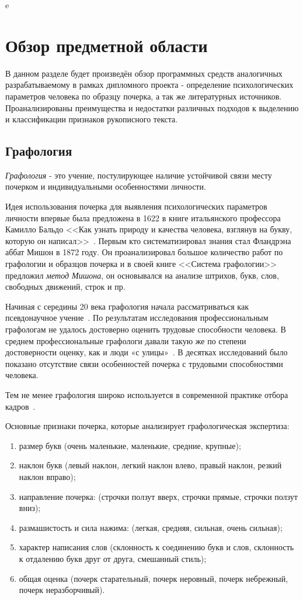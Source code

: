 e\section{Обзор предметной области}
\label{sec:domain:intro}

В данном разделе будет произведён обзор программных средств аналогичных разрабатываемому в рамках дипломного проекта - определение психологических параметров человека по образцу почерка, а так же литературных источников. Проанализированы преимущества и недостатки различных подходов к выделению и классификации признаков рукописного текста.

\subsection{Графология}
\label{sub:domain:grafologic}
\emph{Графология} - это учение, постулирующее наличие устойчивой связи месту почерком и индивидуальными особенностями личности.

Идея использования почерка для выявления психологических параметров личности впервые была предложена в 1622 в книге итальянского профессора Камилло Бальдо <<Как узнать природу и качества человека, взглянув на букву, которую он написал>>~\cite{kamillo_grafology}. Первым кто систематизировал знания стал Фландрэна аббат Мишон в 1872 году. Он проанализировал большое количество работ по графологии и образцов почерка и в своей книге <<Система графологии>> предложил \emph{метод Мишона}, он основывался на анализе штрихов, букв, слов, свободных движений, строк и пр.~\cite{mishon_grafology}

Начиная с середины 20 века графология начала рассматриваться как псевдонаучное учение~\cite{graphology_wiki}. По результатам исследования профессиональным графологам не удалось достоверно оценить трудовые способности человека. В среднем профессиональные графологи давали такую же по степени достоверности оценку, как и люди «с улицы»~\cite{neter_shakhar_psevdograph, king_koehler_psevdograph}. В десятках исследований было показано отсутствие связи особенностей почерка с трудовыми способностями человека.

Тем не менее графология широко используется в современной практике отбора кадров~\cite{graphology_psyfactor}.

Основные признаки почерка, которые анализирует графологическая экспертиза:
\begin{enumerate}
  \item размер букв (очень маленькие, маленькие, средние, крупные);
  \item наклон букв (левый наклон, легкий наклон влево, правый наклон, резкий наклон вправо);
  \item направление почерка: (строчки ползут вверх, строчки прямые,  строчки ползут вниз);
  \item размашистость и сила нажима: (легкая, средняя, сильная, очень сильная);
  \item характер написания слов (склонность к соединению букв и слов, склонность к отдалению букв друг от друга, смешанный стиль);
  \item общая оценка (почерк старательный, почерк неровный, почерк небрежный, почерк неразборчивый).
\end{enumerate}

